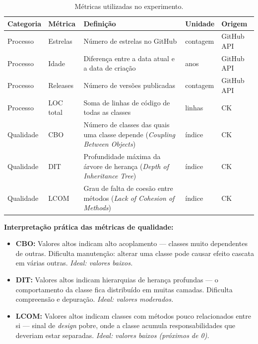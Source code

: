 \documentclass[12pt,a4paper]{article}
\begin{document}
\begin{table}[H]
\centering
\caption{Métricas utilizadas no experimento.}
\label{tab:metricas}
\small
\begin{tabular}{llp{5.5cm}ll}
\toprule
\textbf{Categoria} & \textbf{Métrica} & \textbf{Definição} & \textbf{Unidade} & \textbf{Origem} \\
\midrule
Processo & Estrelas       & Número de estrelas no GitHub                                  & contagem & GitHub API \\
Processo & Idade          & Diferença entre a data atual e a data de criação              & anos     & GitHub API \\
Processo & Releases       & Número de versões publicadas                                  & contagem & GitHub API \\
Processo & LOC total      & Soma de linhas de código de todas as classes                  & linhas   & CK \\
\midrule
Qualidade & CBO           & Número de classes das quais uma classe depende (\textit{Coupling Between Objects}) & índice & CK \\
Qualidade & DIT           & Profundidade máxima da árvore de herança (\textit{Depth of Inheritance Tree})       & índice & CK \\
Qualidade & LCOM          & Grau de falta de coesão entre métodos (\textit{Lack of Cohesion of Methods})        & índice & CK \\
\bottomrule
\end{tabular}
\end{table}

\textbf{Interpretação prática das métricas de qualidade:}

\begin{itemize}
    \item \textbf{CBO:} Valores altos indicam alto acoplamento — classes muito dependentes de outras. Dificulta manutenção: alterar uma classe pode causar efeito cascata em várias outras. \textit{Ideal: valores baixos.}
    \item \textbf{DIT:} Valores altos indicam hierarquias de herança profundas — o comportamento da classe fica distribuído em muitas camadas. Dificulta compreensão e depuração. \textit{Ideal: valores moderados.}
    \item \textbf{LCOM:} Valores altos indicam classes com métodos pouco relacionados entre si — sinal de \textit{design} pobre, onde a classe acumula responsabilidades que deveriam estar separadas. \textit{Ideal: valores baixos (próximos de 0).}
\end{itemize}
\end{document}
